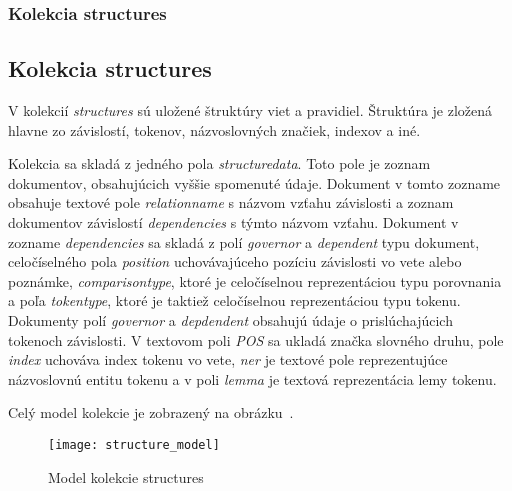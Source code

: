 %
%
{
	\subsubsection{Kolekcia structures}
}
{
	\subsection{Kolekcia structures}
}
\label{subsubsection:collection_structures}
V kolekcií \textit{structures} sú uložené štruktúry viet a pravidiel. Štruktúra je zložená hlavne zo závislostí, tokenov, názvoslovných značiek, indexov a iné.

Kolekcia sa skladá z jedného pola \textit{structure\textunderscore data}. Toto pole je zoznam dokumentov, obsahujúcich vyššie spomenuté údaje. Dokument v tomto zozname obsahuje textové pole \textit{relation\textunderscore name} s názvom vzťahu závislosti a zoznam dokumentov závislostí \textit{dependencies} s týmto názvom vzťahu. Dokument v zozname \textit{dependencies} sa skladá z polí \textit{governor} a \textit{dependent} typu dokument, celočíselného pola \textit{position} uchovávajúceho pozíciu závislosti vo vete alebo poznámke, \textit{comparison\textunderscore type}, ktoré je celočíselnou reprezentáciou typu porovnania a poľa \textit{token\textunderscore type}, ktoré je taktiež celočíselnou reprezentáciou typu tokenu. Dokumenty polí \textit{governor} a \textit{depdendent} obsahujú údaje o prislúchajúcich tokenoch závislosti. V textovom poli \textit{POS} sa ukladá značka slovného druhu, pole \textit{index} uchováva index tokenu vo vete, \textit{ner} je textové pole reprezentujúce názvoslovnú entitu tokenu a v poli \textit{lemma} je textová reprezentácia lemy tokenu.

Celý model kolekcie je zobrazený na obrázku~.

\begin{figure}[H]
	\begin{center}\texttt{[image: structure\_model]}\end{center}
	\caption[Model kolekcie structures]{Model kolekcie structures}\label{fig:structures_collection_model}
\end{figure}

